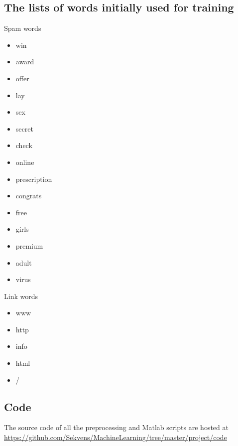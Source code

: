\documentclass[a4paper,11pt]{article}
\theoremstyle{definition}
\begin{document}
  \subsection{The lists of words initially used for training}
  Spam words
  \begin{itemize}
    \item win
    \item award
    \item offer
    \item lay
    \item sex
    \item secret
    \item check
    \item online
    \item prescription
    \item congrats
    \item free
    \item girls
    \item premium
    \item adult
    \item virus
  \end{itemize}
  Link words
  \begin{itemize}
    \item www
    \item http
    \item info
    \item html
    \item /
  \end{itemize}
  \subsection{Code}
    The source code of all the preprocessing and Matlab scripts are hosted at
    \url{https://github.com/Sekvens/MachineLearning/tree/master/project/code}




\end{document}

